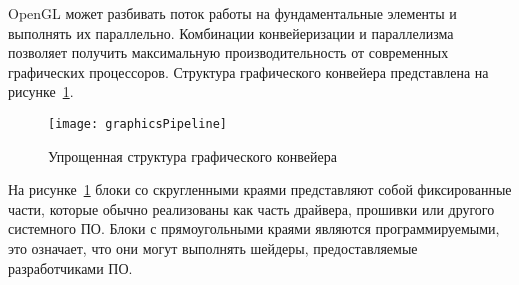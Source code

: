 OpenGL может разбивать поток работы на фундаментальные элементы и выполнять их
параллельно. Комбинации конвейеризации и параллелизма позволяет получить
максимальную производительность от современных графических процессоров.
Структура графического конвейера представлена на
рисунке~\ref{fig:graphicsPipeline}.
\begin{figure}[htb]
	\centering
	\texttt{[image: graphicsPipeline]}
	\caption{Упрощенная структура графического конвейера}%
    \label{fig:graphicsPipeline}
\end{figure}
На рисунке~\ref{fig:graphicsPipeline} блоки со скругленными краями представляют
собой фиксированные части, которые обычно реализованы как часть драйвера,
прошивки или другого системного ПО. Блоки с прямоугольными краями являются
программируемыми, это означает, что они могут выполнять шейдеры, предоставляемые
разработчиками ПО.

